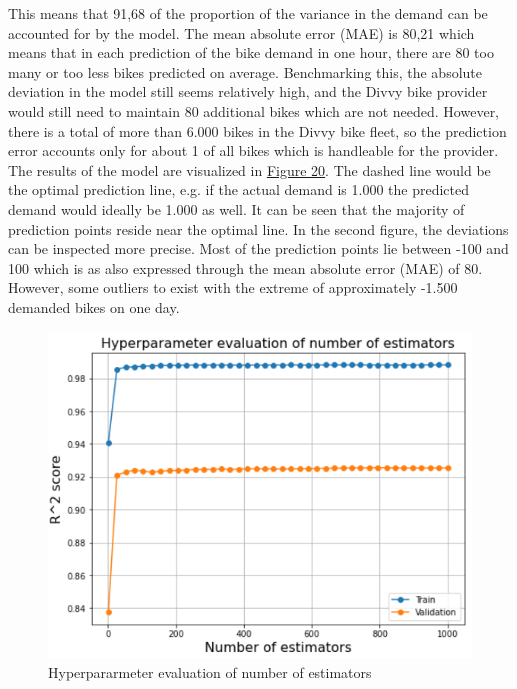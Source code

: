 This means that 91,68 of the proportion of the variance in the demand can be accounted for by the model. The mean absolute error (MAE) is 80,21 which means that in each prediction of the bike demand in one hour, there are 80  too many or too less bikes predicted on average. Benchmarking this, the absolute deviation in the model still seems relatively high, and the Divvy bike provider would still need to maintain 80 additional bikes which are not needed. However, there is a total of more than 6.000 bikes in the Divvy bike fleet, so the prediction error accounts only for about 1 of all bikes which is handleable for the provider. The results of the model are visualized in \hyperref[RF_Fig_2]{Figure 20}. The dashed line would be the optimal prediction line, e.g. if the actual demand is 1.000 the predicted demand would ideally be 1.000 as well. It can be seen that the majority of prediction points reside near the optimal line. In the second figure, the deviations can be inspected more precise. Most of the prediction points lie between -100 and 100 which is as also expressed through the mean absolute error (MAE) of 80. However, some outliers to exist with the extreme of approximately -1.500 demanded bikes on one day.
\begin{figure}[H]
   \centering
    \includegraphics[width=0.5\linewidth]{./Figures/RF_Fig_2.png}
    \caption{Hyperpararmeter evaluation of number of estimators}
    \label{RF_Fig_2}
\end{figure}

